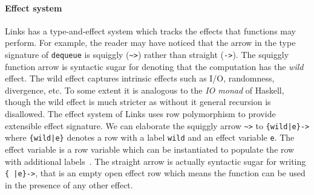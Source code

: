 \documentclass[12pt,mscres,cdtppar,twoside,openright,logo,rightchapter,normalheadings]{infthesis}
\theoremstyle{definition}
\begin{document}
\paragraph{Effect system} 
Links has a type-and-effect system which tracks the effects that
functions may perform. For example, the reader may have noticed that
the arrow in the type signature of \lstinline$dequeue$ is squiggly
(\lstinline$~>$) rather than straight (\lstinline$->$). The squiggly
function arrow is syntactic sugar for denoting that the computation
has the \emph{wild} effect. The wild effect captures intrinsic effects
such as I/O, randomness, divergence, etc. To some extent it is
analogous to the \emph{IO monad} of Haskell, though the wild effect is
much stricter as without it general recursion is disallowed. The
effect system of Links uses row polymorphism to provide extensible
effect signature. We can elaborate the squiggly arrow \lstinline$~>$
to \lstinline${wild|e}->$ where \lstinline${wild|e}$ denotes a row
with a label \lstinline$wild$ and an effect variable
\lstinline$e$. The effect variable is a row variable which can be
instantiated to populate the row with additional
labels~\citep{Hillerstrom2016a}. The straight arrow is actually
syntactic sugar for writing \lstinline${ |e}->$, that is an empty open
effect row which means the function can be used in the presence of any
other effect.
%
\end{document}
